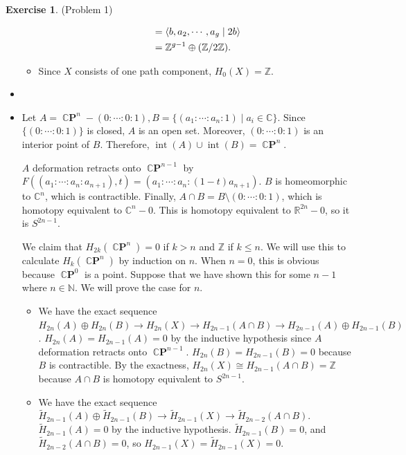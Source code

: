 \documentclass[psamsfonts]{amsart}
\theoremstyle{definition}
\newtheorem*{exer}{Exercise}
\theoremstyle{remark}
\DeclareMathOperator{\Int}{int}
\DeclareMathOperator{\CP}{\mathbb{C}\mathbf{P}}
\numberwithin{equation}{section}
\begin{document}
\begin{exer}{(Problem 1)}
\begin{itemize}
\begin{itemize}
\begin{align*}
               &= \ev{b, a_2, \cdots, a_g \mid 2b} \\
               &= \mathbb{Z}^{g - 1} \oplus (\mathbb{Z}/2\mathbb{Z}).
           \end{align*}
         \item
           Since $X$ consists of one path component, $H_0(X) = \mathbb{Z}$.
       \end{itemize}
     \item
     \item
       Let $A = \CP^n - (0: \cdots : 0:1), B = \{ (a_1: \cdots : a_n:1) \mid a_i \in \mathbb{C} \}$.
       Since $\{ (0: \cdots :0:1) \}$ is closed, $A$ is an open set.
       Moreover, $(0: \cdots :0:1)$ is an interior point of $B$.
       Therefore, $\Int(A) \cup \Int(B) = \CP^n$.

       $A$ deformation retracts onto $\CP^{n - 1}$ by $F((a_1:\cdots :a_n:a_{n + 1}), t) = (a_1:\cdots : a_n:(1 - t)a_{n + 1})$.
       $B$ is homeomorphic to $\mathbb{C}^n$, which is contractible.
       Finally, $A \cap B = B \setminus (0 : \cdots : 0 : 1)$, which is homotopy equivalent to $\mathbb{C}^{n} - 0$.
       This is homotopy equivalent to $\mathbb{R}^{2n} - 0$, so it is $S^{2n - 1}$.

       We claim that $H_{2k}(\CP^n) = 0$ if $k > n$ and $\mathbb{Z}$ if $k \leq n$.
       We will use this to calculate $H_k(\CP^n)$ by induction on $n$.
       When $n = 0$, this is obvious because $\CP^0$ is a point.
       Suppose that we have shown this for some $n - 1$ where $n \in \mathbb{N}$.
       We will prove the case for $n$.
       \begin{itemize}
         \item
           We have the exact sequence $H_{2n}(A) \oplus H_{2n}(B) \rightarrow H_{2n}(X) \rightarrow H_{2n - 1}(A \cap B) \rightarrow H_{2n - 1}(A) \oplus H_{2n - 1}(B)$.
           $H_{2n}(A) = H_{2n - 1}(A) = 0$ by the inductive hypothesis since $A$ deformation retracts onto $\CP^{n - 1}$.
           $H_{2n}(B) = H_{2n - 1}(B) = 0$ because $B$ is contractible.
           By the exactness, $H_{2n}(X) \cong H_{2n - 1}(A \cap B) = \mathbb{Z}$ because $A \cap B$ is homotopy equivalent to $S^{2n - 1}$.
         \item
           We have the exact sequence $\tilde{H}_{2n - 1}(A) \oplus \tilde{H}_{2n - 1}(B) \rightarrow \tilde{H}_{2n - 1}(X) \rightarrow \tilde{H}_{2n - 2}(A \cap B)$.
           $\tilde{H}_{2n - 1}(A) = 0$ by the inductive hypothesis.
           $\tilde{H}_{2n - 1}(B) = 0$, and $\tilde{H}_{2n - 2}(A \cap B) = 0$, so $H_{2n - 1}(X) = \tilde{H}_{2n - 1}(X) = 0$.
       \end{itemize}

  \end{itemize}
\end{exer}
\end{document}
